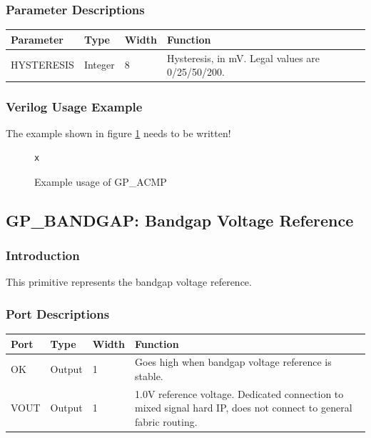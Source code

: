 \documentclass{article}
\begin{document}
\subsubsection{Parameter Descriptions}

\begin{tabularx}{5in}{|l|l|l|X|}
\hline
{\bfseries Parameter} & {\bfseries Type} & {\bfseries Width} & {\bfseries Function} \\
\hline
HYSTERESIS & Integer & 8 &
	Hysteresis, in mV. Legal values are 0/25/50/200.\\
\hline
\end{tabularx}

\subsubsection{Verilog Usage Example}

The example shown in figure \ref{gp-acmp-example} needs to be written!

\begin{figure}[h]
\begin{lstlisting}
x
\end{lstlisting}
\caption{Example usage of GP\_ACMP}
\label{gp-acmp-example}
\end{figure}


\pagebreak
\clearpage
\subsection{GP\_BANDGAP: Bandgap Voltage Reference}

\subsubsection{Introduction}
This primitive represents the bandgap voltage reference.

\subsubsection{Port Descriptions}

\begin{tabularx}{5in}{|l|l|l|X|}
\hline
{\bfseries Port} & {\bfseries Type} & {\bfseries Width} & {\bfseries Function} \\
\hline
OK & Output & 1 & Goes high when bandgap voltage reference is stable. \\
\hline
VOUT & Output & 1 & 1.0V reference voltage.
	Dedicated connection to mixed signal hard IP, does not connect to general fabric routing. \\
\hline
\end{tabularx}
\end{document}
